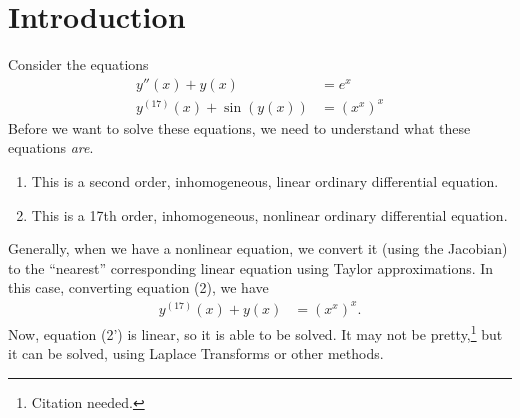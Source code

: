 \documentclass[10pt]{mypackage}
\begin{document}
\RaggedRight
\section{Introduction}%
Consider the equations
\begin{align*}
  y''(x) + y(x) &= e^x\tag*{(1)}\\
  y^{(17)}(x) + \sin\left(y(x)\right) &= \left(x^{x}\right)^{x}\tag*{(2)}
\end{align*}
Before we want to solve these equations, we need to understand what these equations \textit{are}. 
\begin{enumerate}[(1)]
  \item This is a second order, inhomogeneous, linear ordinary differential equation.
  \item This is a 17th order, inhomogeneous, nonlinear ordinary differential equation.
\end{enumerate}
Generally, when we have a nonlinear equation, we convert it (using the Jacobian) to the ``nearest'' corresponding linear equation using Taylor approximations. In this case, converting equation (2), we have
\begin{align*}
  y^{(17)}(x) + y(x) &= \left(x^{x}\right)^{x}.\tag*{(2')}
\end{align*}
Now, equation (2') is linear, so it is able to be solved. It may not be pretty,\footnote{Citation needed.} but it can be solved, using Laplace Transforms or other methods.
\end{document}
